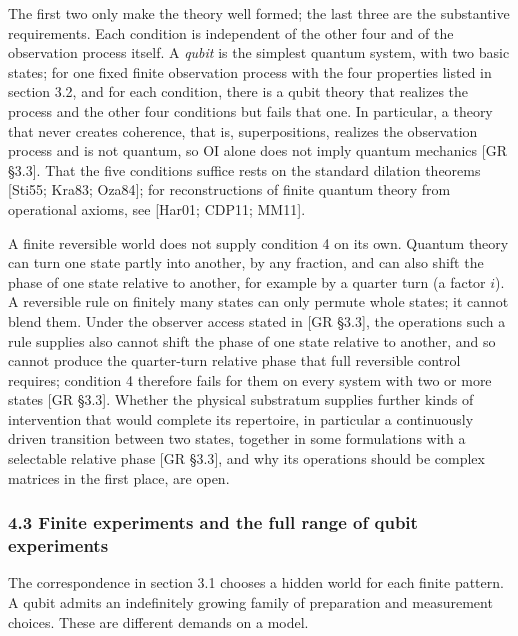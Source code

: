 \documentclass[
]{article}
\begin{document}
The first two only make the theory well formed; the last three are the
substantive requirements. Each condition is independent of the other
four and of the observation process itself. A \emph{qubit} is the
simplest quantum system, with two basic states; for one fixed finite
observation process with the four properties listed in section 3.2, and
for each condition, there is a qubit theory that realizes the process
and the other four conditions but fails that one. In particular, a
theory that never creates coherence, that is, superpositions, realizes
the observation process and is not quantum, so OI alone does not imply
quantum mechanics {[}GR §3.3{]}. That the five conditions suffice rests
on the standard dilation theorems {[}Sti55; Kra83; Oza84{]}; for
reconstructions of finite quantum theory from operational axioms, see
{[}Har01; CDP11; MM11{]}.

A finite reversible world does not supply condition 4 on its own.
Quantum theory can turn one state partly into another, by any fraction,
and can also shift the phase of one state relative to another, for
example by a quarter turn (a factor \(i\)). A reversible rule on
finitely many states can only permute whole states; it cannot blend
them. Under the observer access stated in {[}GR §3.3{]}, the operations
such a rule supplies also cannot shift the phase of one state relative
to another, and so cannot produce the quarter-turn relative phase that
full reversible control requires; condition 4 therefore fails for them
on every system with two or more states {[}GR §3.3{]}. Whether the
physical substratum supplies further kinds of intervention that would
complete its repertoire, in particular a continuously driven transition
between two states, together in some formulations with a selectable
relative phase {[}GR §3.3{]}, and why its operations should be complex
matrices in the first place, are open.

\hypertarget{finite-experiments-and-the-full-range-of-qubit-experiments}{%
\subsubsection{4.3 Finite experiments and the full range of qubit
experiments}\label{finite-experiments-and-the-full-range-of-qubit-experiments}}

The correspondence in section 3.1 chooses a hidden world for each finite
pattern. A qubit admits an indefinitely growing family of preparation
and measurement choices. These are different demands on a model.
\end{document}
